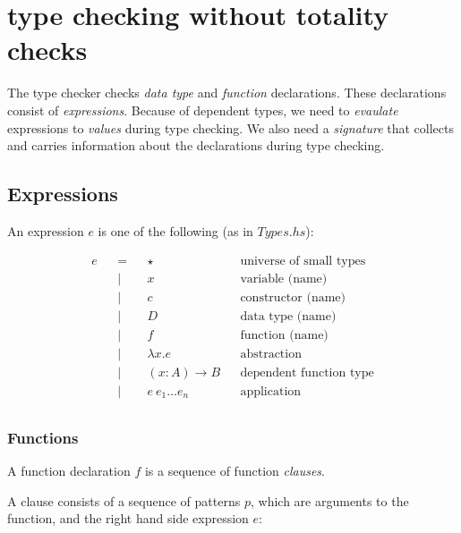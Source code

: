 \section{type checking without totality checks}
\label{sec:prelim}
The type checker checks \emph{data type} and \emph{function} declarations. These declarations
consist of \emph{expressions}. Because of dependent types, we need to \emph{evaulate} expressions to \emph{values} during type checking. We also need a \emph{signature} that collects and carries information about the declarations during type checking.

\subsection{Expressions}

An expression $e$ is one of the following (as in $Types.hs$):

\begin{equation*}
  \begin{aligned}
    e &  & = &  & \star              &  & \textrm{universe of small types} \\
      &  & | &  & x                  &  & \textrm{variable (name)}         \\
      &  & | &  & c                  &  & \textrm{constructor (name)}      \\
      &  & | &  & D                  &  & \textrm{data type (name)}        \\
      &  & | &  & f                  &  & \textrm{function (name)}         \\
      &  & | &  & \lambda x.e        &  & \textrm{abstraction}             \\
      &  & | &  & (x:A) \to B        &  & \textrm{dependent function type} \\
      &  & | &  & e \: e_1 \dots e_n &  & \textrm{application}             \\
  \end{aligned}
\end{equation*}

\subsubsection{Functions}

A function declaration $f$ is a sequence of function \emph{clauses}.

A clause consists of a sequence of \textrm{patterns} $p$, which are
arguments to the function, and the right hand side expression $e$:

